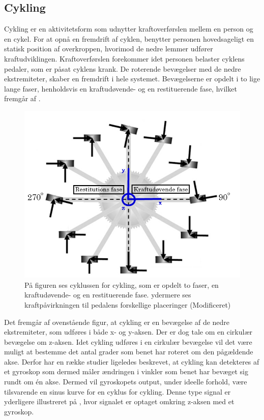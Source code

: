 \subsection{Cykling}
Cykling er en aktivitetsform som udnytter kraftoverførslen mellem en person og en cykel. For at opnå en fremdrift af cyklen, benytter personen hovedsageligt en statisk position af overkroppen, hvorimod de nedre lemmer udfører kraftudviklingen. \citep{Springer2014} \newline 
Kraftoverførslen forekommer idet personen belaster cyklens pedaler, som er påsat cyklens krank. De roterende bevægelser med de nedre ekstremiteter, skaber en fremdrift i hele systemet. Bevægelserne er opdelt i to lige lange faser, henholdsvis en kraftudøvende- og en restituerende fase, hvilket fremgår af .

\begin{figure}[H]
	\centering
	\includegraphics[scale=0.5]{figures/bProblemloesning/cykel_cyklus.png}
	\caption{På figuren ses cyklussen for cykling, som er opdelt to faser, en kraftudøvende- og en restituerende fase. ydermere ses kraftpåvirkningen til pedalens forskellige placeringer \citep{Springer2014} (Modificeret)}
	\label{fig:cykel_cyklus}
\end{figure}

Det fremgår af ovenstående figur, at cykling er en bevægelse af de nedre ekstremiteter, som udføres i både x- og y-aksen. Der er dog tale om en cirkulær bevægelse om z-aksen. \newline
Idet cykling udføres i en cirkulær bevægelse vil det være muligt at bestemme det antal grader som benet har roteret om den pågældende akse. Derfor har en række studier ligeledes beskrevet, at cykling kan detekteres af et gyroskop som dermed måler ændringen i vinkler som benet har bevæget sig rundt om én akse. Dermed vil gyroskopets output, under ideelle forhold, være tilsvarende en sinus kurve for en cyklus for cykling. \citep{Cockcroft2011,Marin-PerianuMarin-Perianu2013} Denne type signal er yderligere illustreret på , hvor signalet er optaget omkring z-aksen med et gyroskop.

